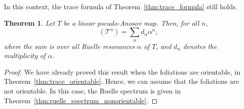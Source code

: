 \documentclass[10pt]{amsart}
\newcommand{\boT}{\mathcal{T}}
\DeclareMathOperator{\flattr}{\mathrm{tr}^{\flat}}
\newtheorem{thm}{Theorem}[section]
\theoremstyle{definition}
\numberwithin{equation}{section}
\begin{document}
In this context, the trace formula of Theorem~\ref{thm:trace_formula} still
holds.
\begin{thm}
Let $T$ be a linear pseudo-Anosov map. Then, for all $n$,
\begin{equation}
\label{eq:wsldfjknrt,nwfkjh}
\flattr(\boT^n) = \sum_\alpha d_\alpha \alpha^n,
\end{equation}
where the sum is over all Ruelle resonances $\alpha$ of $T$, and $d_\alpha$
denotes the multiplicity of $\alpha$.
\end{thm}
\begin{proof}
We have already proved this result when the foliations are orientable, in
Theorem~\ref{thm:trace_orientable}. Hence, we can assume that the foliations
are not orientable. In this case, the Ruelle spectrum is given in
Theorem~\ref{thm:ruelle_spectrum_nonorientable}.


\end{proof}
\end{document}
